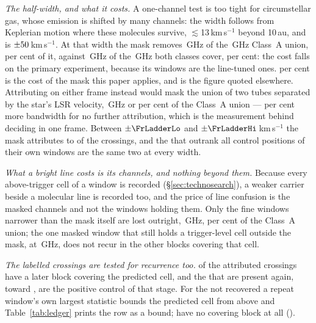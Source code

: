\emph{The half-width, and what it costs.} A one-channel test is too tight for
circumstellar gas, whose emission is shifted by many channels: the width
follows from Keplerian motion where these molecules survive,
$\lesssim$13\,km\,s$^{-1}$ beyond 10\,au, and is
$\pm50$\,km\,s$^{-1}$. At that width the mask removes
\MkMaskAGHz\,GHz of the \CvUnionA\,GHz Class~A union, \MkMaskAPct{} per cent
of it, against \FrMaskLostGHz\,GHz of the \FrMaskUnionGHz\,GHz both classes
cover, \FrMaskPct{} per cent: the cost falls on the primary experiment,
because its windows are the line-tuned ones. \MkMaskAPct{} per cent is the
cost of the mask this paper applies, and is the figure quoted elsewhere.
Attributing on either frame instead would mask the union of two tubes
separated by the star's LSR velocity, \LsMaskTwoGHz\,GHz or
\LsMaskTwoPct{} per cent of the Class~A union --- \LsMaskAddPct{} per cent
more bandwidth for no further attribution, which is the measurement behind
deciding in one frame. Between $\pm\FrLadderLo$ and
$\pm\FrLadderHi$\,km\,s$^{-1}$ the mask attributes \FrAttrWTwenty{} to
\FrAttrWHundred{} of the crossings, and the \FrNRankPass{} that outrank all
\NCtrl{} control positions of their own windows are the same two at every
width.

\emph{What a bright line costs is its channels, and nothing beyond them.}
Because every above-trigger cell of a window is recorded
(\S\ref{sec:technosearch}), a weaker carrier beside a molecular line is
recorded too, and the price of line confusion is the masked channels and not
the windows holding them. Only the \MkNWholly{} fine windows narrower than
the mask itself are lost outright, \MkWhollyGHz\,GHz, \MkWhollyPct{} per
cent of the Class~A union; the one masked window that still holds a
trigger-level cell outside the mask, \MkSurvStar{} at \MkSurvFreq\,GHz, does
not recur in the \MkSurvNRep{} other blocks covering that cell.

\emph{The labelled crossings are tested for recurrence too.} \MkAttrTested{}
of the \MkAttr{} attributed crossings have a later block covering the
predicted cell, and the \MkAttrRecur{} that are present again, toward
\MkAttrRecurStars, are the positive control of that stage. For the
\MkAttrExcl{} not recovered a repeat window's own largest statistic bounds
the predicted cell from above and Table~\ref{tab:ledger} prints the row as a
bound; \MkAttrUntest{} have no covering block at all
(\MkAttrUntestNames).

